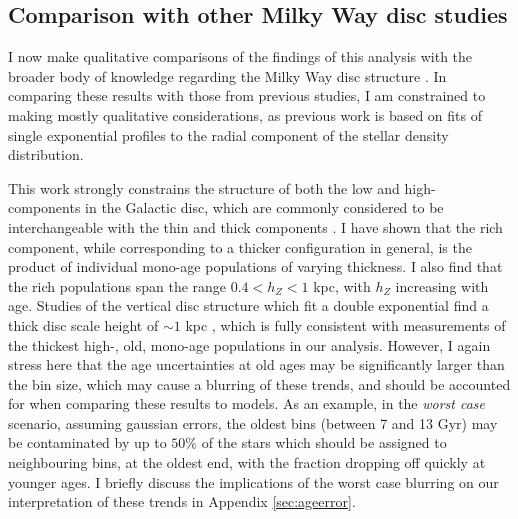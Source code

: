 \subsection{Comparison with other Milky Way disc studies}
I now make qualitative comparisons of the findings of this analysis with the broader body of knowledge regarding the Milky Way disc structure \citep[see, e.g.][for recent reviews]{2013A&ARv..21...61R,2016ARA&A..54..529B}. In comparing these results with those from previous studies, I am constrained to making mostly qualitative considerations, as previous work is based on fits of single exponential profiles to the radial component of the stellar density distribution.

This work strongly constrains the structure of both the low and high-\afe{} components in the Galactic disc, which are commonly considered to be interchangeable with the thin and thick components \citep[as asserted by, e.g.][]{2004A&A...415..155B,2012A&A...545A..32A,1998A&A...338..161F}. I have shown that the \afe{} rich component, while corresponding to a thicker configuration in general, is the product of individual mono-age populations of varying thickness. I also find that the \afe{} rich populations span the range  $ 0.4 < h_Z < 1$ kpc, with $h_Z$ increasing with age. Studies of the vertical disc structure which fit a double exponential find a thick disc scale height of $\sim 1$ kpc  \citep[e.g.][]{1983MNRAS.202.1025G,2008ApJ...673..864J}, which is fully consistent with measurements of the thickest high-\afe{}, old, mono-age populations in our analysis. However, I again stress here that the age uncertainties at old ages may be significantly larger than the bin size, which may cause a blurring of these trends, and should be accounted for when comparing these results to models. As an example, in the \emph{worst case} scenario, assuming gaussian errors, the oldest bins (between 7 and 13 Gyr) may be contaminated by up to $50\%$ of the stars which should be assigned to neighbouring bins, at the oldest end, with the fraction dropping off quickly at younger ages. I briefly discuss the implications of the worst case blurring on our interpretation of these trends in Appendix \ref{sec:ageerror}.

